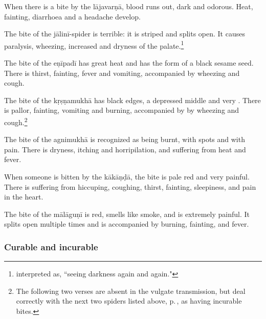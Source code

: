\begin{translation}
\item[123]

When there is a bite by the \Gls{lājavarṇā}, blood runs out, dark and odorous. 
Heat, fainting, diarrhoea and a headache develop.

\item[124]

The bite of the \Gls{jālinī-spider} is terrible: it is striped and splits open. It 
causes paralysis, wheezing, increased  and dryness of 
the palate.\footnote{ interpreted  
as, “seeing darkness again and again."} 

\item[125]

The bite of the \Gls{eṇīpadī} has great heat and has the form of a black sesame 
seed.  There is thirst, fainting, fever and vomiting, accompanied by wheezing 
and cough. 

\item [125 add 1]

The bite of the \Gls{kṛṣṇamukhā} has black edges, a depressed middle
and very .  There is pallor, fainting, vomiting and
burning, accompanied by by wheezing and cough.\footnote{The following
    two verses are absent in the vulgate transmission, but deal correctly
    with the next two spiders listed above,
    p.\,\pageref{sauvarnika-group}, as having incurable bites.}

\item [125 add 2]

The bite of the \Gls{agnimukhā} is recognized as being burnt, with spots and 
with pain.  There is dryness, itching and horripilation, and suffering from heat 
and fever.

\item [126]

When someone is bitten by the \Gls{kākāṇḍā}, the bite is pale red and very 
painful. There is suffering from hiccuping, coughing, thirst, fainting, sleepiness, 
and pain in the heart.

\item [127]

The bite of the \Gls{mālāguṇī} is red, smells like smoke, and is extremely 
painful.  It splits open multiple times and is accompanied by burning, fainting, 
and fever. 

 \subsubsection{Curable and incurable}
 

\end{translation}
